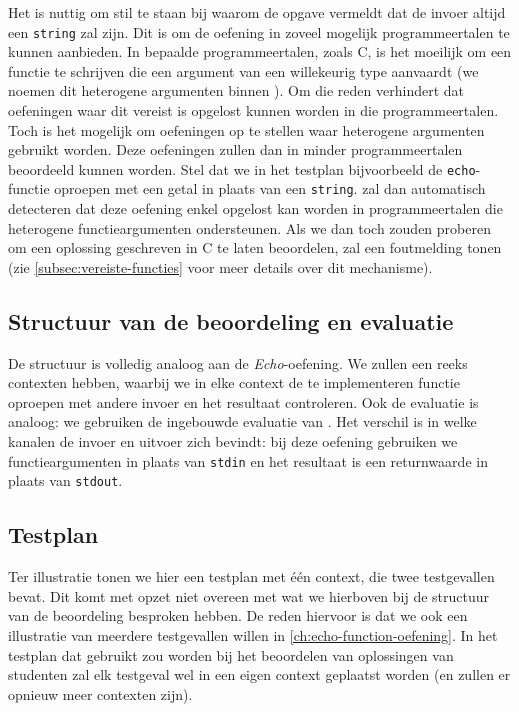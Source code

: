 Het is nuttig om stil te staan bij waarom de opgave vermeldt dat de invoer altijd een \texttt{string} zal zijn.
Dit is om de oefening in zoveel mogelijk programmeertalen te kunnen aanbieden.
In bepaalde programmeertalen, zoals C, is het moeilijk om een functie te schrijven die een argument van een willekeurig type aanvaardt (we noemen dit heterogene argumenten binnen \tested{}).
Om die reden verhindert \tested{} dat oefeningen waar dit vereist is opgelost kunnen worden in die programmeertalen.
Toch is het mogelijk om oefeningen op te stellen waar heterogene argumenten gebruikt worden.
Deze oefeningen zullen dan in minder programmeertalen beoordeeld kunnen worden.
Stel dat we in het testplan bijvoorbeeld de \texttt{echo}-functie oproepen met een getal in plaats van een \texttt{string}.
\tested{} zal dan automatisch detecteren dat deze oefening enkel opgelost kan worden in programmeertalen die heterogene functieargumenten ondersteunen.
Als we dan toch zouden proberen om een oplossing geschreven in C te laten beoordelen, zal \tested{} een foutmelding tonen (zie \cref{subsec:vereiste-functies} voor meer details over dit mechanisme).

\subsection{Structuur van de beoordeling en evaluatie}\label{subsec:oefening-echofunctie-structuur}

De structuur is volledig analoog aan de \emph{Echo}-oefening.
We zullen een reeks contexten hebben, waarbij we in elke context de te implementeren functie oproepen met andere invoer en het resultaat controleren.
Ook de evaluatie is analoog: we gebruiken de ingebouwde evaluatie van \tested{}.
Het verschil is in welke kanalen de invoer en uitvoer zich bevindt: bij deze oefening gebruiken we functieargumenten in plaats van \texttt{stdin} en het resultaat is een returnwaarde in plaats van \texttt{stdout}.

\subsection{Testplan}\label{subsec:oefening-echofunctie-testplan}

Ter illustratie tonen we hier een testplan met één context, die twee testgevallen bevat.
Dit komt met opzet niet overeen met wat we hierboven bij de structuur van de beoordeling besproken hebben.
De reden hiervoor is dat we ook een illustratie van meerdere testgevallen willen in \cref{ch:echo-function-oefening}.
In het testplan dat gebruikt zou worden bij het beoordelen van oplossingen van studenten zal elk testgeval wel in een eigen context geplaatst worden (en zullen er opnieuw meer contexten zijn).

